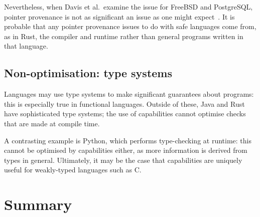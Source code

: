 \documentclass[dissertation.tex]{subfiles}
\begin{document}
Nevertheless, when Davis et al.\ examine the issue for FreeBSD and
PostgreSQL, pointer provenance is not as significant an issue as one
might expect~\cite{cheri-2019-abstract}.
It is probable that any pointer provenance issues to do with safe
languages come from, as in Rust, the compiler and runtime rather than
general programs written in that language.


\subsection{Non-optimisation: type systems}
Languages may use type systems to make significant guarantees about
programs: this is especially true in functional languages.
Outside of these, Java and Rust have sophisticated type systems; the use
of capabilities cannot optimise checks that are made at compile time.

A contrasting example is Python, which performs type-checking at
runtime: this cannot be optimised by capabilities either, as more
information is derived from types in general.
Ultimately, it may be the case that capabilities are uniquely useful for
weakly-typed languages such as C.


\section{Summary}
\label{sec:eval-summary}
\end{document}
